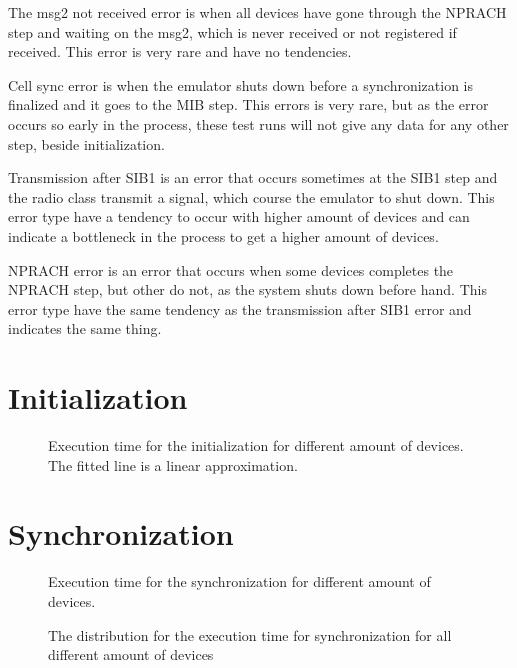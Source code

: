 The msg2 not received error is when all devices have gone through the NPRACH step and waiting on the msg2, which is never received or not registered if received. This error is very rare and have no tendencies.

Cell sync error is when the emulator shuts down before a synchronization is finalized and it goes to the MIB step. This errors is very rare, but as the error occurs so early in the process, these test runs will not give any data for any other step, beside initialization.

Transmission after SIB1 is an error that occurs sometimes at the SIB1 step and the radio class transmit a signal, which course the emulator to shut down. This error type have a tendency to occur with higher amount of devices and can indicate a bottleneck in the process to get a higher amount of devices.

NPRACH error is an error that occurs when some devices completes the NPRACH step, but other do not, as the system shuts down before hand. This error type have the same tendency as the transmission after SIB1 error and indicates the same thing.





\section{Initialization}

\begin{figure}[H]
\centering
\resizebox{0.5\textwidth}{!}{
}
\caption{Execution time for the initialization for different amount of devices. The fitted line is a linear approximation.}
\label{fig:MT_Init_Time}
\end{figure}

\section{Synchronization}

\begin{figure}[H]
\centering
\resizebox{0.5\textwidth}{!}{
}
\caption{Execution time for the synchronization for different amount of devices.}
\label{fig:MT_Sync_Time}
\end{figure}

\begin{figure}[H]
\centering
\resizebox{0.5\textwidth}{!}{
}
\caption{The distribution for the execution time for synchronization for all different amount of devices}
\label{fig:MT_Sync_His}
\end{figure}

